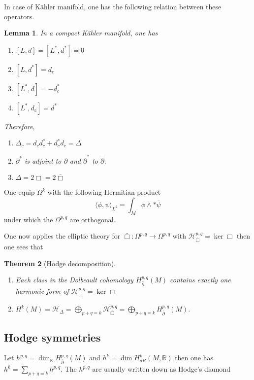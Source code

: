 \documentclass[11pt]{article}
\newtheorem{theorem}{Theorem}
\newtheorem{lemma}[theorem]{Lemma}
\begin{document}
In case of Kähler manifold, one has the following relation between these operators.

\begin{lemma}
In a compact Kähler manifold, one has 
\begin{enumerate}
\item \([L,d] = [L^*, d^*] = 0\)
\item \([L, d^*] = d_c\)
\item \([L^*, d] = -d^*_c\)
\item \([L^*,d_c] =d^*\)
\end{enumerate}
Therefore,       
\begin{enumerate}
\item \(\Delta_c = d_c d^*_c + d^*_c d_c = \Delta\)
\item \(\partial^*\) is adjoint to \(\partial\) and \(\bar\partial^*\) to \(\bar\partial\).
\item \(\Delta = 2\Box = 2\bar\Box\)
\end{enumerate}
\end{lemma}

One equip \(\Omega^k\) with the following Hermitian product
\[
\langle \phi, \psi \rangle_{L^2} = \int_M \phi\wedge *\bar \psi 
\]
under which the \(\Omega^{p,q}\) are orthogonal.

One now applies the elliptic theory for \(\bar \Box: \Omega^{p,q} \longrightarrow \Omega^{p,q}\) with \(\mathcal{H}^{p,q}_{\bar \Box} = \ker \Box\) then one sees that
\begin{theorem}[Hodge decomposition]
\label{thm:hodge-decomp}
\begin{enumerate}
\item Each class in the Dolbeault cohomology \(H^{p,q}_{\bar \partial}(M)\) contains
exactly one harmonic form of \(\mathcal{H}^{p,q}_{\bar \Box} = \ker \bar\Box\)
\item \(H^k(M) = \mathcal{H}_\Delta = \bigoplus_{p+q=k} \mathcal{H}^{p,q}_{\bar\Box} = \bigoplus_{p+q=k} H^{p,q}_{\bar\partial}(M)\).
\end{enumerate}
\end{theorem}

\subsection{Hodge symmetries}
\label{sec:orgc6cef03}
Let \(h^{p,q} = \dim_{\mathbb{R}} H^{p,q}_{\bar \partial}(M)\) and \(h^k = \dim
   H^k_{dR}(M, \mathbb{R})\) then one has \(h^k = \sum_{p+q = k} h^{p,q}\). The \(h^{p,q}\) are usually written down as Hodge's diamond
\end{document}
